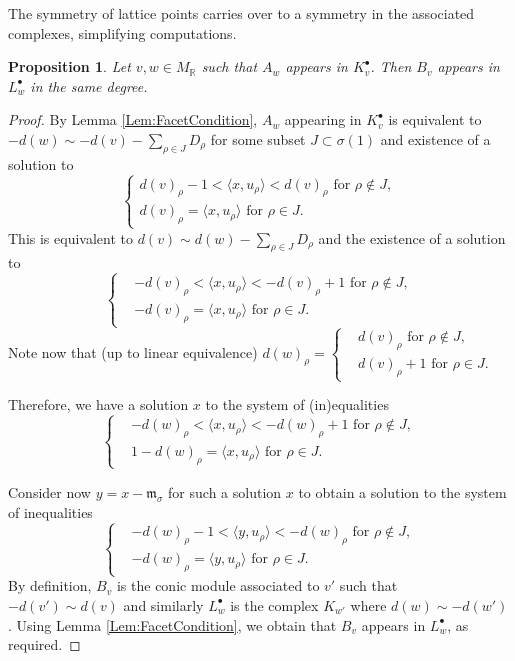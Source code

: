 \documentclass[reqno, 12pt]{amsart}
\newtheorem{proposition}[theorem]{Proposition}
\theoremstyle{definition}
\numberwithin{equation}{section}
\newcommand{\R}{\mathbb{R}}
\begin{document}
\noindent The symmetry of lattice points carries over to a symmetry in the associated complexes, simplifying computations.

\begin{proposition}
    \label{Prop:GorSymDoubleswitch}
    Let $v,w\in M_\R$ such that $A_w$ appears in $K_v^\bullet$. Then $B_v$ appears in $L_{w}^\bullet$ in the same degree.
\end{proposition}
\begin{proof}
    By Lemma \ref{Lem:FacetCondition}, $A_w$ appearing in $K_v^\bullet$ is equivalent to $-d(w)\sim -d(v)-\sum_{\rho\in J}D_\rho$ for some subset $J\subset \sigma(1)$ and existence of a solution to \[
            \begin{cases} d(v)_\rho-1 <\langle x,u_\rho\rangle <d(v)_\rho \text{ for }\rho \not\in J,\\
             d(v)_\rho =\langle x,u_\rho\rangle\text{ for } \rho \in J.\end{cases}
        \]
    This is equivalent to $d(v)\sim d(w)-\sum_{\rho\in J}D_\rho$ and the existence of a solution to\[
    \begin{cases}
        & -d(v)_\rho <\langle x,u_\rho\rangle < -d(v)_\rho+1\text{ for }\rho\not\in J,\\
        &-d(v)_\rho =\langle x,u_\rho\rangle \text{ for }\rho\in J.
    \end{cases}
    \]
    Note now that (up to linear equivalence) $d(w)_\rho=\begin{cases}
        & d(v)_\rho\text{ for }\rho\not\in J,\\
        & d(v)_\rho+1 \text{ for }\rho\in J.
    \end{cases}$
    
    \noindent Therefore, we have a solution $x$ to the system of (in)equalities \[
    \begin{cases}
        & -d(w)_\rho <\langle x,u_\rho\rangle <-d(w)_\rho+1\text{ for }\rho\not\in J,\\
        & 1- d(w)_\rho =\langle x,u_\rho\rangle\text{ for }\rho\in J.
    \end{cases}
    \]

    Consider now $y=x-\mathfrak{m}_\sigma$ for such a solution $x$ to obtain a solution to the system of inequalities\[
    \begin{cases}
        & -d(w)_\rho-1<\langle y,u_\rho\rangle <-d(w)_\rho\text{ for }\rho\not\in J,\\
        & -d(w)_\rho=\langle y,u_\rho\rangle\text{ for }\rho\in J.
    \end{cases}
    \]
    By definition, $B_v$ is the conic module associated to $v'$ such that $-d(v')\sim d(v)$ and similarly $L_w^\bullet$ is the complex $K_{w'}$ where $d(w)\sim -d(w')$. Using Lemma \ref{Lem:FacetCondition}, we obtain that $B_v$ appears in $L_w^\bullet$, as required.
\end{proof}
\end{document}
